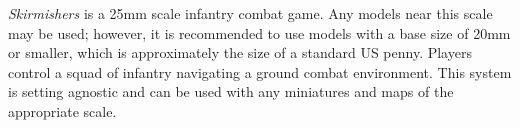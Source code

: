 \emph{Skirmishers} is a 25mm scale infantry combat game.
Any models near this scale may be used; however, it is recommended to use models with a base size of 20mm or smaller, which is approximately the size of a standard US penny.
Players control a squad of infantry navigating a ground combat environment.
This system is setting agnostic and can be used with any miniatures and maps of the appropriate scale.
